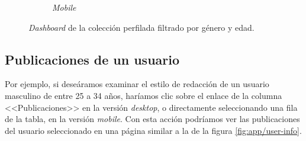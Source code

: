 \begin{figure}[H]
\begin{subfigure}{0.223\textwidth}
  \caption{\textit{Mobile}} 
  \end{subfigure}
  \caption{\textit{Dashboard} de la colección perfilada filtrado por género y edad.}
  \label{fig:app/dashboard-filtered-edad-genero}
\end{figure}

\subsection{Publicaciones de un usuario}
Por ejemplo, si deseáramos examinar el estilo de redacción de un usuario masculino de entre 25 a 34 años, haríamos clic sobre el enlace de la columna <<Publicaciones>> en la versión \textit{desktop}, o directamente seleccionando una fila de la tabla, en la versión \textit{mobile}. Con esta acción podríamos ver las publicaciones del usuario seleccionado en una página similar a la de la figura \ref{fig:app/user-info}.

